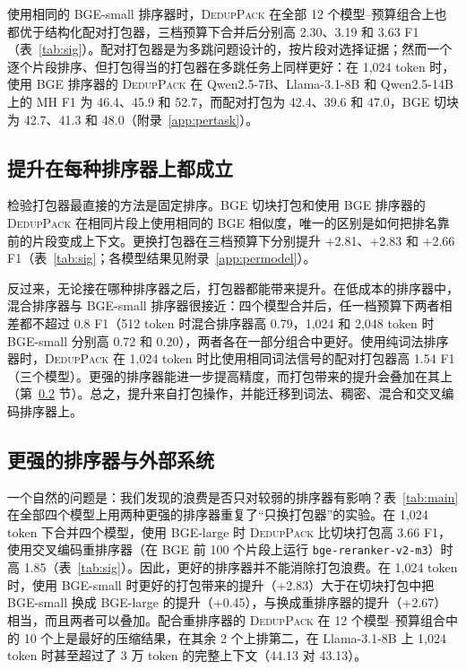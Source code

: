\documentclass[11pt]{article}
\newcommand{\spk}{\textsc{DedupPack}}
\begin{document}
使用相同的 BGE-small 排序器时，\spk{} 在全部 12 个模型--预算组合上也都优于结构化配对打包器，三档预算下合并后分别高 2.30、3.19 和 3.63 F1（表~\ref{tab:sig}）。配对打包器是为多跳问题设计的，按片段对选择证据；然而一个逐个片段排序、但打包得当的打包器在多跳任务上同样更好：在 1,024 token 时，使用 BGE 排序器的 \spk{} 在 Qwen2.5-7B、Llama-3.1-8B 和 Qwen2.5-14B 上的 MH F1 为 46.4、45.9 和 52.7，而配对打包为 42.4、39.6 和 47.0，BGE 切块为 42.7、41.3 和 48.0（附录~\ref{app:pertask}）。

\subsection{提升在每种排序器上都成立}
\label{sec:agnostic}
检验打包器最直接的方法是固定排序。BGE 切块打包和使用 BGE 排序器的 \spk{} 在相同片段上使用相同的 BGE 相似度，唯一的区别是如何把排名靠前的片段变成上下文。更换打包器在三档预算下分别提升 +2.81、+2.83 和 +2.66 F1（表~\ref{tab:sig}；各模型结果见附录~\ref{app:permodel}）。

反过来，无论接在哪种排序器之后，打包器都能带来提升。在低成本的排序器中，混合排序器与 BGE-small 排序器很接近：四个模型合并后，任一档预算下两者相差都不超过 0.8 F1（512 token 时混合排序器高 0.79，1,024 和 2,048 token 时 BGE-small 分别高 0.72 和 0.20），两者各在一部分组合中更好。使用纯词法排序器时，\spk{} 在 1,024 token 时比使用相同词法信号的配对打包器高 1.54 F1（三个模型）。更强的排序器能进一步提高精度，而打包带来的提升会叠加在其上（第~\ref{sec:external} 节）。总之，提升来自打包操作，并能迁移到词法、稠密、混合和交叉编码排序器上。

\subsection{更强的排序器与外部系统}
\label{sec:external}

一个自然的问题是：我们发现的浪费是否只对较弱的排序器有影响？表~\ref{tab:main} 在全部四个模型上用两种更强的排序器重复了“只换打包器”的实验。在 1,024 token 下合并四个模型，使用 BGE-large 时 \spk{} 比切块打包高 3.66 F1，使用交叉编码重排序器（在 BGE 前 100 个片段上运行 \texttt{bge-reranker-v2-m3}）时高 1.85（表~\ref{tab:sig}）。因此，更好的排序器并不能消除打包浪费。在 1,024 token 时，使用 BGE-small 时更好的打包带来的提升（+2.83）大于在切块打包中把 BGE-small 换成 BGE-large 的提升（+0.45），与换成重排序器的提升（+2.67）相当，而且两者可以叠加。配合重排序器的 \spk{} 在 12 个模型--预算组合中的 10 个上是最好的压缩结果，在其余 2 个上排第二，在 Llama-3.1-8B 上 1,024 token 时甚至超过了 3 万 token 的完整上下文（44.13 对 43.13）。
\end{document}

